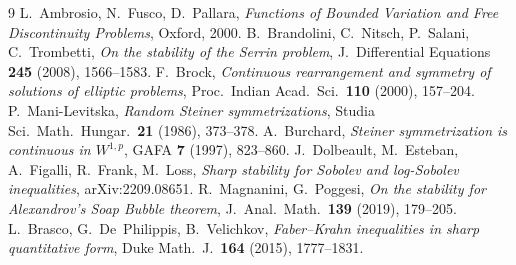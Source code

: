 \documentclass[11pt]{article}
\theoremstyle{definition}
\begin{document}
\begin{thebibliography}{9}
 L.~Ambrosio, N.~Fusco, D.~Pallara, \emph{Functions of
Bounded Variation and Free Discontinuity Problems}, Oxford, 2000.
 B.~Brandolini, C.~Nitsch, P.~Salani, C.~Trombetti,
\emph{On the stability of the Serrin problem}, J.~Differential Equations
\textbf{245} (2008), 1566--1583.
 F.~Brock, \emph{Continuous rearrangement and symmetry of
solutions of elliptic problems}, Proc.\ Indian Acad.\ Sci.\ \textbf{110}
(2000), 157--204.
 P.~Mani-Levitska, \emph{Random Steiner
symmetrizations}, Studia Sci.\ Math.\ Hungar.\ \textbf{21} (1986),
373--378.
 A.~Burchard, \emph{Steiner symmetrization is continuous
in $W^{1,p}$}, GAFA \textbf{7} (1997), 823--860.
 J.~Dolbeault, M.~Esteban, A.~Figalli, R.~Frank, M.~Loss,
\emph{Sharp stability for Sobolev and log-Sobolev inequalities},
arXiv:2209.08651.
 R.~Magnanini, G.~Poggesi, \emph{On the stability for
Alexandrov's Soap Bubble theorem}, J.~Anal.\ Math.\ \textbf{139} (2019),
179--205.
 L.~Brasco, G.~De~Philippis, B.~Velichkov, \emph{Faber--Krahn
inequalities in sharp quantitative form}, Duke Math.~J.\ \textbf{164}
(2015), 1777--1831.
\end{thebibliography}
\end{document}
